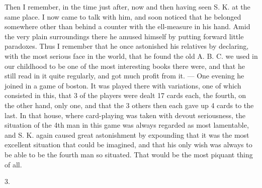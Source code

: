 \documentclass[12pt,a4paper,openany]{book}
\newcommand{\secnum}[1]{\par\begin{center}#1\end{center}\par\nobreak}
\begin{document}
Then I remember, in the time just after, now and then
having seen S. K. at the same place. I now came to
talk with him, and soon noticed that he belonged somewhere
other than behind a counter with the ell-measure in his hand.
Amid the very plain surroundings there he amused himself
by putting forward little paradoxes. Thus I remember
that he once astonished his relatives by declaring, with
the most serious face in the world, that he found
the old A. B. C. we used in our childhood to be one
of the most interesting books there were, and that he
still read in it quite regularly, and got much profit
from it. --- One evening he joined in a game of boston. It was played
there with variations, one of which consisted in this, that
3 of the players were dealt 17 cards each, the
fourth, on the other hand, only one, and that the 3 others then each gave up
4 cards to the last. In that house, where card-playing was taken
with devout seriousness, the situation of the 4th man in this game
was always regarded as most lamentable,
and S. K. again caused great astonishment by expounding that
it was the most excellent situation that could
be imagined, and that his only wish was always to be able to be
the fourth man so situated. That would be the
most piquant thing of all.

\secnum{3.}
\end{document}
